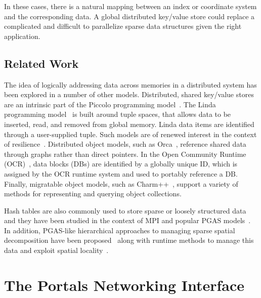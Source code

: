 In these cases, there is a natural mapping between an index or
coordinate system and the corresponding data. A global distributed
key/value store could replace a complicated and difficult to parallelize
sparse data structures given the right application.

\subsection{Related Work}

The idea of logically addressing data across memories in a distributed
system has been explored in a number of other models.  Distributed,
shared key/value stores are an intrinsic part of the Piccolo
programming model~\cite{power:10}.  The Linda programming
model~\cite{ahuja:86} is built around tuple spaces, that allows data
to be inserted, read, and removed from global memory. Linda data items
are identified through a user-supplied tuple.  Such models are of
renewed interest in the context of resilience~\cite{wilke:14}.
Distributed object models, such as Orca~\cite{bal:92}, reference
shared data through graphs rather than direct pointers.  In the Open
Community Runtime (OCR)~\cite{OCR}, data blocks (DBs) are identified
by a globally unique ID, which is assigned by the OCR runtime system
and used to portably reference a DB.  Finally, migratable object
models, such as Charm++~\cite{kale:93}, support a variety of methods
for representing and querying object collections.

Hash tables are also commonly used to store sparse or loosely structured data
and they have been studied in the context of MPI and popular PGAS
models~\cite{maynard:12}.  In addition, PGAS-like hierarchical approaches to
managing sparse spatial decomposition have been proposed~\cite{larkins:08}
along with runtime methods to manage this data and exploit spatial
locality~\cite{larkins:12}.

\section{The Portals Networking Interface}





